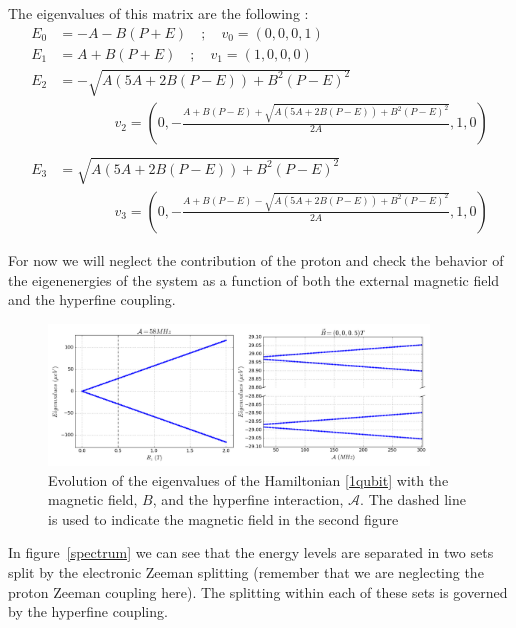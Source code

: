 The eigenvalues of this matrix are the following :
\begin{equation}
  \begin{split}
    E_0 &= -A-B(P+E) \quad;\quad v_0=\left(0,0,0,1\right)\\
    E_1 &= A+B(P+E) \quad;\quad v_1=\left(1,0,0,0\right)\\
    E_2 &= -\sqrt{A(5A+2B(P-E)) + B^2 (P-E)^2} \\
        &\quad\quad\quad\quad v_2 =\left(0,-\frac{A+B(P-E)+\sqrt{A(5A+2B(P-E)) + B^2 (P-E)^2}}{2 A},1,0\right)\\
    \quad\\
    E_3 &= \sqrt{A(5A+2B(P-E)) + B^2 (P-E)^2}\\
        &\quad\quad\quad\quad v_3 = \left(0,-\frac{A+B(P-E)-\sqrt{A(5A+2B(P-E)) + B^2 (P-E)^2}}{2 A},1,0\right)
  \end{split}
\label{eig}
\end{equation}



For now we will neglect the contribution of the proton and check the behavior of the eigenenergies of the system as a function of both the external magnetic field and the hyperfine coupling.
\begin{figure}[h!]
\centering
\includegraphics[width=0.9\textwidth]{chapter03/figures/spectrum.png}
\vspace{-5pt}
\caption{Evolution of the eigenvalues of the Hamiltonian \eqref{1qubit} with the magnetic field, $B$, and the hyperfine interaction, $\mathcal{A}$. The dashed line is used to indicate the magnetic field in the second figure}
\end{figure}
\FloatBarrier
In figure~\ref{spectrum} we can see that the energy levels are separated in two sets split by the electronic Zeeman splitting (remember that we are neglecting the proton Zeeman coupling here). The splitting within each of these sets is governed by the hyperfine coupling.

